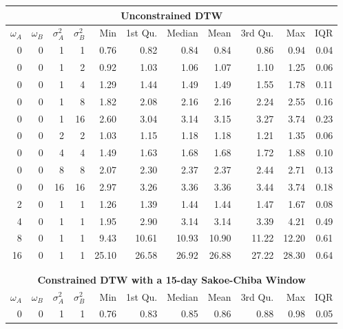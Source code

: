 \documentclass[12pt]{article}
\begin{document}
\begin{table}[!ht]
    \fontsize{10pt}{10pt}\selectfont
    \begin{center}
      \begin{tabular}{r r r r | r r r r r r r}
        \multicolumn{11}{c}{\textbf{Unconstrained DTW}} \\
        \midrule
        $\omega_{A}$ & $\omega_{B}$ & $\sigma^{2}_{A}$ & $\sigma^{2}_{B}$ & Min & 1st Qu. & Median & Mean & 3rd Qu. & Max & IQR \\
        \midrule
        0  & 0 & 1  & 1  & 0.76 & 0.82 & 0.84 & 0.84 & 0.86 & 0.94 & 0.04 \\
        \midrule
        0  & 0 & 1  & 2  & 0.92 & 1.03 & 1.06 & 1.07 & 1.10 & 1.25 & 0.06 \\
        0  & 0 & 1  & 4  & 1.29 & 1.44 & 1.49 & 1.49 & 1.55 & 1.78 & 0.11 \\
        0  & 0 & 1  & 8  & 1.82 & 2.08 & 2.16 & 2.16 & 2.24 & 2.55 & 0.16 \\
        0  & 0 & 1  & 16 & 2.60 & 3.04 & 3.14 & 3.15 & 3.27 & 3.74 & 0.23 \\
        \midrule
        0  & 0 & 2  & 2  & 1.03 & 1.15 & 1.18 & 1.18 & 1.21 & 1.35 & 0.06 \\
        0  & 0 & 4  & 4  & 1.49 & 1.63 & 1.68 & 1.68 & 1.72 & 1.88 & 0.10 \\
        0  & 0 & 8  & 8  & 2.07 & 2.30 & 2.37 & 2.37 & 2.44 & 2.71 & 0.13 \\
        0  & 0 & 16 & 16 & 2.97 & 3.26 & 3.36 & 3.36 & 3.44 & 3.74 & 0.18 \\
        \midrule
        2  & 0 & 1  & 1  &  1.26 &  1.39 &  1.44 &  1.44 &  1.47 &  1.67 & 0.08 \\
        4  & 0 & 1  & 1  &  1.95 &  2.90 &  3.14 &  3.14 &  3.39 &  4.21 & 0.49 \\
        8  & 0 & 1  & 1  &  9.43 & 10.61 & 10.93 & 10.90 & 11.22 & 12.20 & 0.61 \\
        16 & 0 & 1  & 1  & 25.10 & 26.58 & 26.92 & 26.88 & 27.22 & 28.30 & 0.64 \\
        \hline
        \\
        \\
        \multicolumn{11}{c}{\textbf{Constrained DTW with a 15-day Sakoe-Chiba Window}} \\
        \midrule
        $\omega_{A}$ & $\omega_{B}$ & $\sigma^{2}_{A}$ & $\sigma^{2}_{B}$ & Min & 1st Qu. & Median & Mean & 3rd Qu. & Max & IQR \\
        \midrule
        0  & 0 & 1  & 1  & 0.76 & 0.83 & 0.85 & 0.86 & 0.88 & 0.98 & 0.05 \\

\end{tabular}
\end{center}
\end{table}
\end{document}
